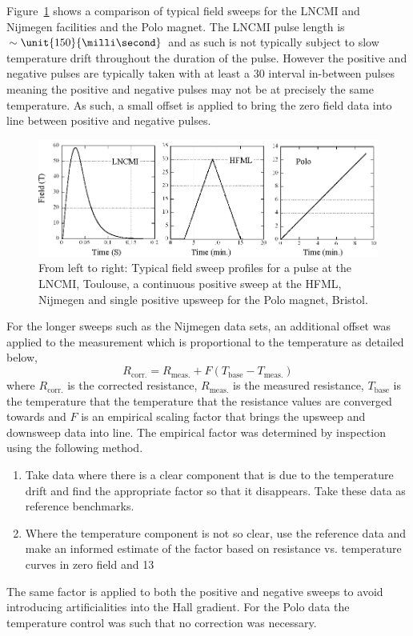 Figure~\ref{Fig:Exp:ComparisonFieldSweeps} shows a comparison of typical field sweeps for the \ac{LNCMI} and Nijmegen facilities and the Polo magnet. The \ac{LNCMI} pulse length is $\sim\unit{150}{\milli\second}$ and as such is not typically subject to slow temperature drift throughout the duration of the pulse. However the positive and negative pulses are typically taken with at least a \unit{30}{\minute} interval in-between pulses meaning the positive and negative pulses may not be at precisely the same temperature. As such, a small offset is applied to bring the zero field data into line between positive and negative pulses.
\begin{figure}[htbp]
    \begin{center}
        \includegraphics[scale=0.9]{Chapter-ExperimentalTechnique/Figures/ComparisonFieldSweeps/ComparisonFieldSweeps}
        \caption{From left to right: Typical field sweep profiles for a pulse at the \ac{LNCMI}, Toulouse, a continuous positive sweep at the \ac{HFML}, Nijmegen and single positive upsweep for the Polo magnet, Bristol.}
        \label{Fig:Exp:ComparisonFieldSweeps}
    \end{center}
\end{figure}
For the longer sweeps such as the Nijmegen data sets, an additional offset was applied to the measurement which is proportional to the temperature as detailed below,
\begin{equation}
    R_{\textrm{corr.}} = R_{\textrm{meas.}} + F(T_{\textrm{base}} - T_{\textrm{meas.}})
\end{equation}
where $R_{\textrm{corr.}}$ is the corrected resistance, $R_{\textrm{meas.}}$ is the measured resistance, $T_{\textrm{base}}$ is the temperature that the temperature that the resistance values are converged towards and $F$ is an empirical scaling factor that brings the upsweep and downsweep data into line. The empirical factor was determined by inspection using the following method.
\begin{enumerate}
\item Take data where there is a clear component that is due to the temperature drift and find the appropriate factor so that it disappears. Take these data as reference benchmarks.
\item Where the temperature component is not so clear, use the reference data and make an informed estimate of the factor based on resistance vs. temperature curves in zero field and \unit{13}{\tesla}
\end{enumerate}
The same factor is applied to both the positive and negative sweeps to avoid introducing artificialities into the Hall gradient. For the Polo data the temperature control was such that no correction was necessary.

